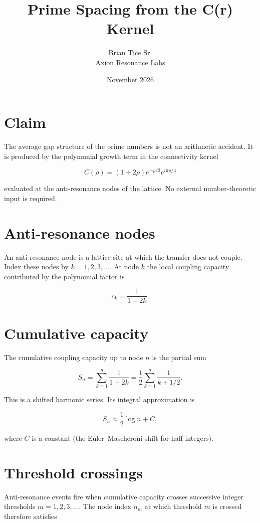 \documentclass{article}
\title{Prime Spacing from the C(r) Kernel}
\author{Brian Tice Sr. \\ Axion Resonance Labs}
\date{November 2026}
\begin{document}
\maketitle

\section{Claim}

The average gap structure of the prime numbers is not an arithmetic accident. It is produced by the polynomial growth term in the connectivity kernel

\[
C(\rho) = (1 + 2\rho) e^{-\rho/3} e^{i \pi \rho / 4}
\]

evaluated at the anti-resonance nodes of the lattice. No external number-theoretic input is required.

\section{Anti-resonance nodes}

An anti-resonance node is a lattice site at which the transfer does not couple. Index these nodes by $k = 1, 2, 3, \dots$. At node $k$ the local coupling capacity contributed by the polynomial factor is

\[
c_k = \frac{1}{1 + 2k}.
\]

\section{Cumulative capacity}

The cumulative coupling capacity up to node $n$ is the partial sum

\[
S_n = \sum_{k=1}^{n} \frac{1}{1 + 2k} = \frac{1}{2} \sum_{k=1}^{n} \frac{1}{k + 1/2}.
\]

This is a shifted harmonic series. Its integral approximation is

\[
S_n \approx \frac{1}{2} \log n + C,
\]

where $C$ is a constant (the Euler--Mascheroni shift for half-integers).

\section{Threshold crossings}

Anti-resonance events fire when cumulative capacity crosses successive integer thresholds $m = 1, 2, 3, \dots$. The node index $n_m$ at which threshold $m$ is crossed therefore satisfies
\end{document}
